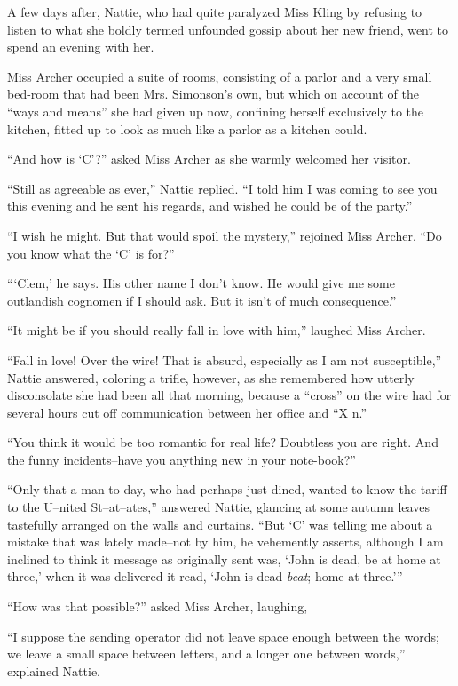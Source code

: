 A few days after, Nattie, who had quite paralyzed Miss Kling by refusing
to listen to what she boldly termed unfounded gossip about her new
friend, went to spend an evening with her.

Miss Archer occupied a suite of rooms, consisting of a parlor and a very
small bed-room that had been Mrs. Simonson's own, but which on account
of the ``ways and means'' she had given up now, confining herself
exclusively to the kitchen, fitted up to look as much like a parlor as a
kitchen could.

``And how is `C'?'' asked Miss Archer as she warmly welcomed her visitor.

``Still as agreeable as ever,'' Nattie replied. ``I told him I was coming
to see you this evening and he sent his regards, and wished he could be
of the party.''

``I wish he might. But that would spoil the mystery,'' rejoined Miss
Archer. ``Do you know what the `C' is for?''

``{}`Clem,' he says. His other name I don't know. He would give me some
outlandish cognomen if I should ask. But it isn't of much consequence.''

``It might be if you should really fall in love with him,'' laughed Miss
Archer.

``Fall in love! Over the wire! That is absurd, especially as I am not
susceptible,'' Nattie answered, coloring a trifle, however, as she
remembered how utterly disconsolate she had been all that morning,
because a ``cross'' on the wire had for several hours cut off
communication between her office and ``X n.''

``You think it would be too romantic for real life? Doubtless you are
right. And the funny incidents--have you anything new in your
note-book?''

``Only that a man to-day, who had perhaps just dined, wanted to know the
tariff to the U--nited St--at--ates,'' answered Nattie, glancing at some
autumn leaves tastefully arranged on the walls and curtains. ``But `C'
was telling me about a mistake that was lately made--not by him, he
vehemently asserts, although I am inclined to think it message as
originally sent was, `John is dead, be at home at three,' when it was
delivered it read, `John is dead \emph{beat}; home at three.'{}''

``How was that possible?'' asked Miss Archer, laughing,

``I suppose the sending operator did not leave space enough between the
words; we leave a small space between letters, and a longer one between
words,'' explained Nattie.

